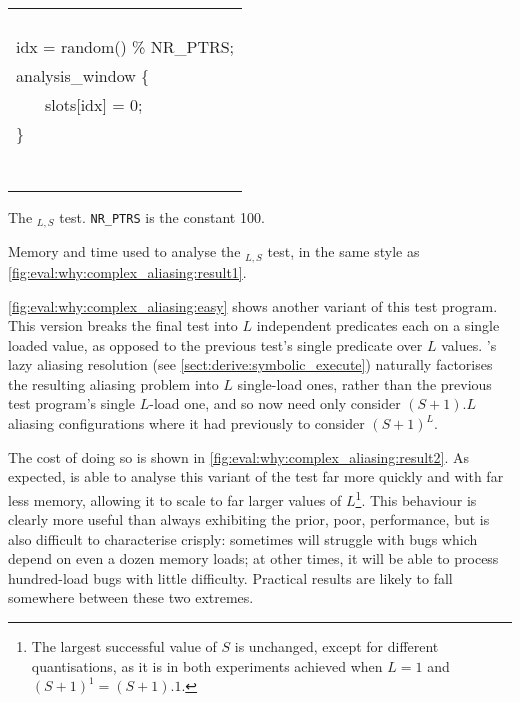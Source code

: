 \begin{sanefig}
{{{\begin{tabular}{ll}
        \\
        \\
        \\
        \\
        \\
        \multicolumn{2}{l}{idx = random() \% NR\_PTRS;}\\
        \multicolumn{2}{l}{analysis\_window \{} \\
        & slots[idx] = 0; \\
        \multicolumn{2}{l}{\}}\\
        \\
        \\
        \\
        \\
        \\
        \\
        \\
      \end{tabular}
    }
  }
  }
  {\hfill}
  \caption{The $_{L,S}$ test.
    \texttt{NR\_PTRS} is the constant 100.}
  \label{fig:eval:why:complex_aliasing:easy}
\end{sanefig}

\begin{sanefig}
  \caption{Memory and time used to analyse the
    $_{L,S}$ test, in the same style as
    \autoref{fig:eval:why:complex_aliasing:result1}.}
  \label{fig:eval:why:complex_aliasing:result2}
\end{sanefig}

\autoref{fig:eval:why:complex_aliasing:easy} shows another variant of
this test program.  This version breaks the final test into $L$
independent predicates each on a single loaded value, as opposed to
the previous test's single predicate over $L$ values.  {\Technique}'s
lazy aliasing resolution (see \autoref{sect:derive:symbolic_execute})
naturally factorises the resulting aliasing problem into $L$
single-load ones, rather than the previous test program's single
$L$-load one, and so {\technique} now need only consider $(S+1).L$
aliasing configurations where it had previously to consider $(S+1)^L$.

The cost of doing so is shown in
\autoref{fig:eval:why:complex_aliasing:result2}.  As expected,
        {\technique} is able to analyse this variant of the test far
        more quickly and with far less memory, allowing it to scale to
        far larger values of $L$\footnote{The largest successful value
          of $S$ is unchanged, except for different quantisations, as
          it is in both experiments achieved when $L=1$ and $(S+1)^1 =
          (S+1).1$.}\hspace{-1ex}.  This behaviour is clearly more
        useful than always exhibiting the prior, poor, performance,
        but is also difficult to characterise crisply: sometimes
        {\technique} will struggle with bugs which depend on even a
        dozen memory loads; at other times, it will be able to process
        hundred-load bugs with little difficulty.  Practical results
        are likely to fall somewhere between these two extremes.

